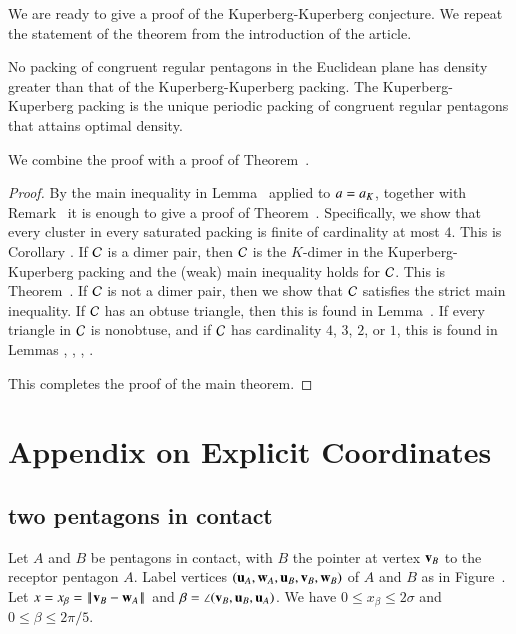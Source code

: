 We are ready to give a proof of the Kuperberg-Kuperberg conjecture. We repeat the statement
of the theorem from the introduction of the article.  

\begin{theorem}   No packing of congruent regular pentagons in the Euclidean
plane has density greater than that of
the Kuperberg-Kuperberg packing.   The Kuperberg-Kuperberg packing is the
unique periodic packing of congruent regular pentagons that attains optimal density.
\end{theorem}

We combine the proof with a proof of Theorem~.

\begin{proof}
By the main inequality in Lemma~ applied to $a=a_K$, together with Remark~
it is enough to give a proof of Theorem~.  Specifically, we show that
every cluster in every saturated packing is finite of cardinality at most $4$.  
This is Corollary .
If $\mathcal C$ is a dimer pair, then $\mathcal C$ is the $K$-dimer in the Kuperberg-Kuperberg packing and the (weak)
main inequality holds for $\mathcal C$.  This is Theorem~.  If $\mathcal C$ is not a dimer pair, then
we show that $\mathcal C$ satisfies the strict main inequality.  If $\mathcal C$ has an obtuse triangle, then this
is found in Lemma~.  If every triangle in $\mathcal C$ is nonobtuse, and if $\mathcal C$ has cardinality $4$, $3$,  $2$, or $1$,
this is found in Lemmas , , , .

This completes the proof of the main theorem.
\end{proof}



\section{Appendix on Explicit Coordinates}


\subsection{two pentagons in contact}

Let $A$ and $B$ be pentagons in contact, with $B$ the pointer at
vertex ${\mathbf v}_B$ to the receptor pentagon $A$.  Label vertices
$({\mathbf u}_A,{\mathbf w}_A,{\mathbf u}_B,{\mathbf v}_B,{\mathbf w}_B)$ of $A$ and $B$ as in
Figure~.  Let $x=x_\beta=\norm{\v_B}{\w_A}$ and $\beta =
\angle({\mathbf v}_B,{\mathbf u}_B,{\mathbf u}_A)$.  We have $0\le x_\beta\le 2\sigma$ and $0\le
\beta\le 2\pi/5$.


